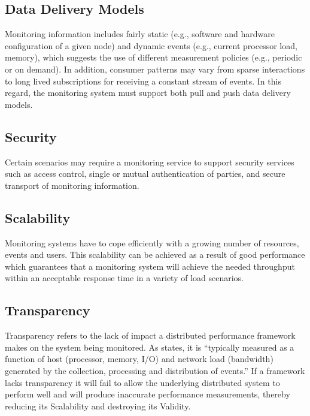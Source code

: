 \subsection{Data Delivery Models}

Monitoring information includes fairly static (e.g., software and hardware configuration of a given node) and dynamic
events (e.g., current processor load, memory), which suggests the use of different measurement policies (e.g., periodic
or on demand). In addition, consumer patterns may vary from sparse interactions to long lived subscriptions for
receiving a constant stream of events. In this regard, the monitoring system must support both pull and push data
delivery models.
\cite{zanikolas2005}

\subsection{Security}

Certain scenarios may require a monitoring service to support security services such as access control, single or mutual
authentication of parties, and secure transport of monitoring information.
\cite{zanikolas2005}

\subsection{Scalability}

Monitoring systems have to cope efficiently with a growing number of resources, events and users. This scalability can
be achieved as a result of good performance which guarantees that a monitoring system will achieve the needed throughput
within an acceptable response time in a variety of load scenarios.
\cite{zanikolas2005}

\subsection{Transparency}

Transparency refers to the lack of impact a distributed performance framework makes on the system being monitored. As
\cite{zanikolas2005} states, it is ``typically measured as a function of host (processor, memory, I/O) and network load
(bandwidth) generated by the collection, processing and distribution of events.'' If a framework lacks transparency it
will fail to allow the underlying distributed system to perform well and will produce inaccurate performance
measurements, thereby reducing its Scalability and destroying its Validity.

